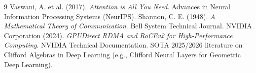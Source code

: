 \documentclass[11pt, a4paper]{article}
\begin{document}
\begin{thebibliography}{9}
Vaswani, A. et al. (2017). \textit{Attention is All You Need}. Advances in Neural Information Processing Systems (NeurIPS).
Shannon, C. E. (1948). \textit{A Mathematical Theory of Communication}. Bell System Technical Journal.
NVIDIA Corporation (2024). \textit{GPUDirect RDMA and RoCEv2 for High-Performance Computing}. NVIDIA Technical Documentation.
SOTA 2025/2026 literature on Clifford Algebras in Deep Learning (e.g., Clifford Neural Layers for Geometric Deep Learning).
\end{thebibliography}
\end{document}
